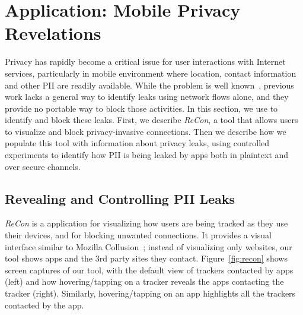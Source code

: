 \section{Application: Mobile Privacy\\ Revelations}
\label{sec:characterize-app}


Privacy has rapidly become a critical issue for user interactions with Internet services, particularly in 
mobile environment where location, contact information and other PII are readily available. While the problem 
is well known~\cite{roesner:webtrackers,leontiadis:mobileads,vallina-rod:ads}, previous work lacks a general 
way to identify leaks using network flows alone, and they provide no portable way to block those 
activities. In this section, we use \meddle to identify and block these leaks. First, we describe \emph{ReCon}, 
a tool that allows users to visualize and block privacy-invasive connections. Then we describe how we populate 
this tool with information about privacy leaks, using controlled experiments to identify how PII is being leaked by apps  
 both in plaintext and over secure channels. 

\subsection{Revealing and Controlling PII Leaks}
\label{subsec:recon}

\emph{ReCon} is a \meddle application for visualizing how users are being tracked as they 
use their devices, and for blocking unwanted connections.
It provides a visual interface similar to Mozilla Collusion~\cite{collusion}; instead of 
visualizing only websites, our tool shows apps and the 3rd party sites they contact. 
Figure~\ref{fig:recon} shows screen captures of our tool, with the default view of trackers contacted by apps (left) and how 
hovering/tapping on a tracker reveals the apps contacting the tracker (right). Similarly, hovering/tapping on an app 
highlights all the trackers contacted by the app.

